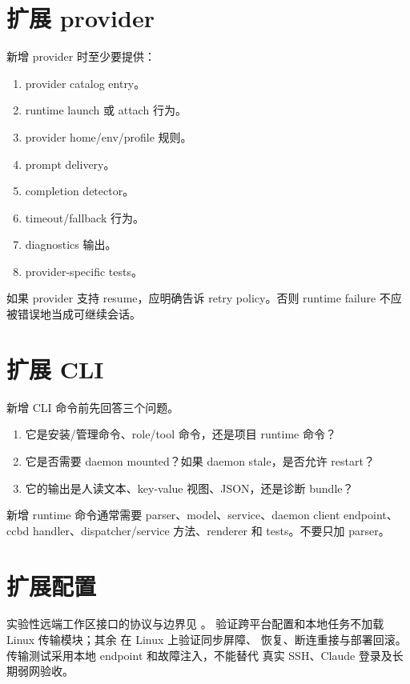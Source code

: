 \section{扩展 provider}

新增 provider 时至少要提供：

\begin{enumerate}
  \item provider catalog entry。
  \item runtime launch 或 attach 行为。
  \item provider home/env/profile 规则。
  \item prompt delivery。
  \item completion detector。
  \item timeout/fallback 行为。
  \item diagnostics 输出。
  \item provider-specific tests。
\end{enumerate}

如果 provider 支持 resume，应明确告诉 retry policy。否则 runtime failure 不应被错误地当成可继续会话。

\section{扩展 CLI}

新增 CLI 命令前先回答三个问题。

\begin{enumerate}
  \item 它是安装/管理命令、role/tool 命令，还是项目 runtime 命令？
  \item 它是否需要 daemon mounted？如果 daemon stale，是否允许 restart？
  \item 它的输出是人读文本、key-value 视图、JSON，还是诊断 bundle？
\end{enumerate}

新增 runtime 命令通常需要 parser、model、service、daemon client endpoint、ccbd handler、dispatcher/service 方法、renderer 和 tests。不要只加 parser。

\section{扩展配置}

实验性远端工作区接口的协议与边界见 。
 验证跨平台配置和本地任务不加载
Linux 传输模块；其余  在 Linux 上验证同步屏障、
恢复、断连重接与部署回滚。传输测试采用本地 endpoint 和故障注入，不能替代
真实 SSH、Claude 登录及长期弱网验收。

